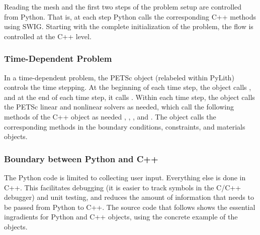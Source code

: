 Reading the mesh and the first two steps of the problem setup are
controlled from Python. That is, at each step Python calls the
corresponding C++ methods using SWIG. Starting with the complete
initialization of the problem, the flow is controlled at the C++
level.

\subsubsection{Time-Dependent Problem}

In a time-dependent problem, the PETSc  object (relabeled
 within PyLith) controls the time stepping. At the
beginning of each time step, the  object calls
, and at the end of each
time step, it calls .
Within each time step, the  object calls the PETSc
linear and nonlinear solvers as needed, which call the following
methods of the C++  object as
needed
,
,
, and
.
The  object calls the corresponding methods in the boundary conditions,
constraints, and materials objects.

\subsubsection{Boundary between Python and C++}

The Python code is limited to collecting user input. Everything else
is done in C++. This facilitates debugging (it is easier to track
symbols in the C/C++ debugger) and unit testing, and reduces the
amount of information that needs to be passed from Python to C++. The
source code that follows shows the essential ingradients for Python
and C++ objects, using the concrete example of the 
objects.



